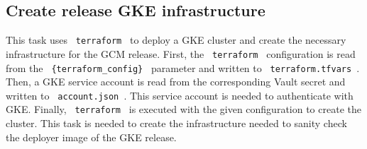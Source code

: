 \subsection{Create release GKE infrastructure}\label{subsec:create-release-gke-infrastructure}

This task uses \verb| terraform | to deploy a GKE cluster and create the necessary infrastructure for the GCM release.
First, the \verb| terraform | configuration is read from the \verb| {terraform_config} | parameter and written to \verb| terraform.tfvars |.
Then, a GKE service account is read from the corresponding Vault secret and written to \verb| account.json |.
This service account is needed to authenticate with GKE.
Finally, \verb| terraform | is executed with the given configuration to create the cluster.
This task is needed to create the infrastructure needed to sanity check the deployer image of the GKE release.
